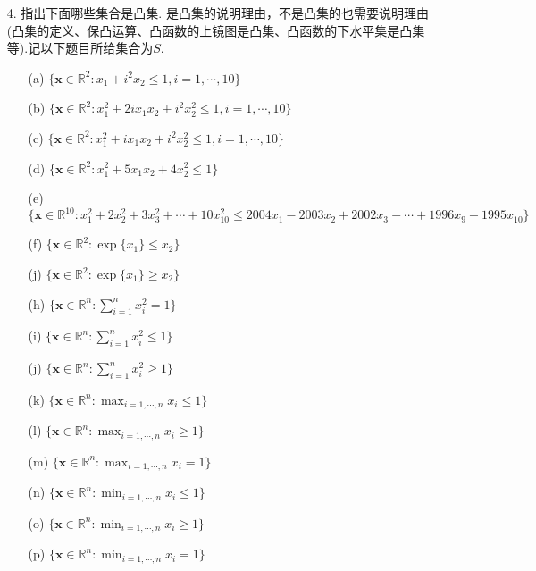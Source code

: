 \documentclass[a4paper,12pt]{ctexart}
\def\R{{\mathbb R}}%
\newcommand\bx{{\bm x}}
\begin{document}
\begin{enumerate}
\item [4.] 指出下面哪些集合是凸集. 是凸集的说明理由，不是凸集的也需要说明理由(凸集的定义、保凸运算、凸函数的上镜图是凸集、凸函数的下水平集是凸集等).记以下题目所给集合为$S$.
\begin{itemize}
\item[(a)] $\{\bx\in\R^2:x_1+i^2x_2\leq1,i=1,\cdots,10\}$

\item[(b)] $\{\bx\in\R^2:x_1^2+2ix_1x_2+i^2x_2^2\leq1,i=1,\cdots,10\}$

\item[(c)] $\{\bx\in\R^2:x_1^2+ix_1x_2+i^2x_2^2\leq1,i=1,\cdots,10\}$

\item[(d)] $\{\bx\in\R^2:x_1^2+5x_1x_2+4x_2^2\leq1\}$

\item[(e)] $\{\bx\in\R^{10}:x_1^2+2x_2^2+3x_3^2+\cdots+10x_{10}^2\leq2004x_1-2003x_2+2002x_3-\cdots+1996x_9-1995x_{10}\}$

\item[(f)]
$\{\bx\in\R^2:\exp\{x_1\}\leq x_2\}$

\item[(j)]
$\{\bx\in\R^2:\exp\{x_1\}\geq x_2\}$

\item[(h)]
$\{\bx\in\R^n:\sum_{i=1}^nx_i^2=1\}$

\item[(i)]
$\{\bx\in\R^n:\sum_{i=1}^nx_i^2\leq1\}$

\item[(j)]
$\{\bx\in\R^n:\sum_{i=1}^nx_i^2\geq1\}$

\item[(k)]
$\{\bx\in\R^n:\max_{i=1,\cdots,n}x_i\leq1\}$

\item[(l)]
$\{\bx\in\R^n:\max_{i=1,\cdots,n}x_i\geq1\}$

\item[(m)]
$\{\bx\in\R^n:\max_{i=1,\cdots,n}x_i=1\}$

\item[(n)]
$\{\bx\in\R^n:\min_{i=1,\cdots,n}x_i\leq1\}$

\item[(o)]
$\{\bx\in\R^n:\min_{i=1,\cdots,n}x_i\geq1\}$

\item[(p)]
$\{\bx\in\R^n:\min_{i=1,\cdots,n}x_i=1\}$

\end{itemize}


\end{enumerate}
\end{document}
